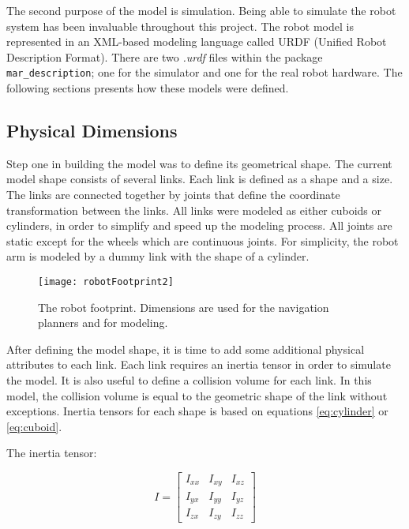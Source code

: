 The second purpose of the model is simulation. Being able to simulate the robot system has been invaluable throughout this project. The robot model is represented in an XML-based modeling language called \ac{URDF} (Unified Robot Description Format). There are two \textit{.urdf} files within the package \texttt{mar\_description}; one for the simulator and one for the real robot hardware. The following sections presents how these models were defined.


\subsection{Physical Dimensions}

Step one in building the model was to define its geometrical shape. The current model shape consists of several links. Each link is defined as a shape and a size. The links are connected together by joints that define the coordinate transformation between the links. All links were modeled as either cuboids or cylinders, in order to simplify and speed up the modeling process. All joints are static except for the wheels which are continuous joints. For simplicity, the robot arm is modeled by a dummy link with the shape of a cylinder.

\begin{figure}[h]
	\centering
	\texttt{[image: robotFootprint2]}
	\caption{The robot footprint. Dimensions are used for the navigation planners and for modeling. }
	\label{fig:robotFootprint}
\end{figure}

After defining the model shape, it is time to add some additional physical attributes to each link. Each link requires an inertia tensor in order to simulate the model. It is also useful to define a collision volume for each link. In this model, the collision volume is equal to the geometric shape of the link without exceptions. Inertia tensors for each shape is based on equations \ref{eq:cylinder} or \ref{eq:cuboid}.

The inertia tensor:

\begin{equation}
    	I = \begin{bmatrix}
    	I_{xx} & I_{xy} & I_{xz} \\[0.3em]
    	I_{yx} & I_{yy} & I_{yz} \\[0.3em]
    	I_{zx} & I_{zy} & I_{zz}
    	\end{bmatrix}
\end{equation}

